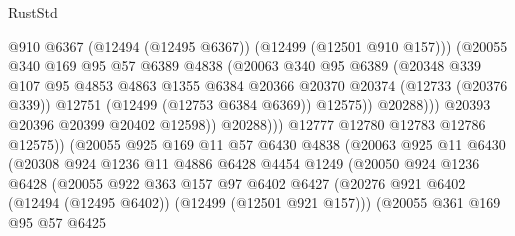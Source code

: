 \begin{lexlean}{RustStd}
\begin{coremodule}
                                @910
                                @6367
                                (@12494 (@12495 @6367))
                                (@12499 (@12501 @910 @157)))
                              (@20055
                                @340
                                @169
                                @95
                                @57
                                @6389
                                @4838
                                (@20063
                                  @340
                                  @95
                                  @6389
                                  (@20348
                                    @339
                                    @107
                                    @95
                                    @4853
                                    @4863
                                    @1355
                                    @6384
                                    @20366
                                    @20370
                                    @20374
                                    (@12733 (@20376 @339))
                                    @12751
                                    (@12499 (@12753 @6384 @6369))
                                    @12575))
                                @20288)))
                          @20393
                          @20396
                          @20399
                          @20402
                          @12598))
                      @20288)))
                @12777
                @12780
                @12783
                @12786
                @12575))
            (@20055
              @925
              @169
              @11
              @57
              @6430
              @4838
              (@20063
                @925
                @11
                @6430
                (@20308
                  @924
                  @1236
                  @11
                  @4886
                  @6428
                  @4454
                  @1249
                  (@20050
                    @924
                    @1236
                    @6428
                    (@20055
                      @922
                      @363
                      @157
                      @97
                      @6402
                      @6427
                      (@20276 @921 @6402 (@12494 (@12495 @6402)) (@12499 (@12501 @921 @157)))
                      (@20055
                        @361
                        @169
                        @95
                        @57
                        @6425

\end{coremodule}
\end{lexlean}
